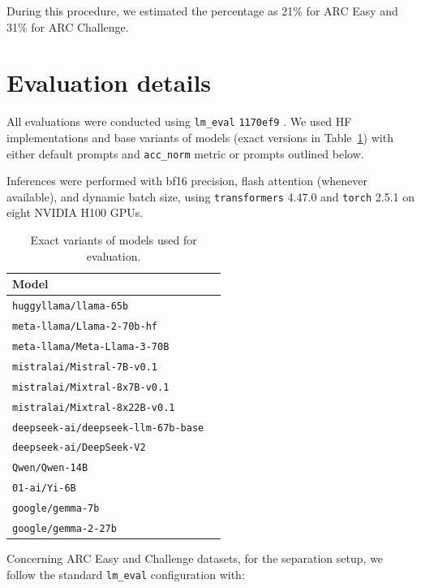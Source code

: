 \documentclass[11pt]{article}
\DeclareRobustCommand{\shl}[3]{
  \begingroup\setlength{\fboxsep}{2pt}%
  \colorbox{#1}{{\hspace*{2pt}\vphantom{Ay}#2\hspace*{2pt}}}%
  \endgroup
}
\begin{document}
\noindent During this procedure, we estimated the percentage as 21\% for ARC Easy and 31\% for ARC Challenge.

\section{Evaluation details}

All evaluations were conducted using \texttt{lm\_eval} \texttt{1170ef9} \cite{eval-harness}. We used HF implementations and base variants of models (exact versions in Table~\ref{tab:models}) with either default prompts and \texttt{acc\_norm} metric or prompts outlined below. %

Inferences were performed with bf16 precision, flash attention (whenever available), and dynamic batch size, using \texttt{transformers} 4.47.0 and \texttt{torch}  2.5.1 on eight NVIDIA H100 GPUs.

\begin{table}[ht]
    \centering
    \small
    \begin{tabular}{ll}
        \toprule
        Model \\
        \midrule
        \texttt{huggyllama/llama-65b} \\
        \texttt{meta-llama/Llama-2-70b-hf} \\
        \texttt{meta-llama/Meta-Llama-3-70B} \\
        \texttt{mistralai/Mistral-7B-v0.1} \\
        \texttt{mistralai/Mixtral-8x7B-v0.1} \\
        \texttt{mistralai/Mixtral-8x22B-v0.1} \\
        \texttt{deepseek-ai/deepseek-llm-67b-base} \\
        \texttt{deepseek-ai/DeepSeek-V2} \\
        \texttt{Qwen/Qwen-14B} \\
        \texttt{01-ai/Yi-6B} \\
        \texttt{google/gemma-7b} \\
        \texttt{google/gemma-2-27b} \\
        \bottomrule
    \end{tabular}
    \caption{Exact variants of models used for evaluation.}
    \label{tab:models}
\end{table}

Concerning ARC Easy and Challenge datasets, for the \shl{separation}{separation}{} setup, we follow the standard \texttt{lm\_eval} configuration with:
\end{document}
